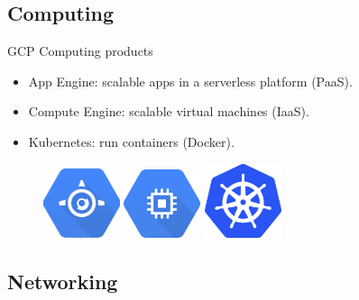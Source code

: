 \documentclass{beamer}
\begin{document}
\subsection{Computing}

\begin{frame}[fragile]{GCP Computing products}
  \begin{itemize}[<+->]
    \item App Engine: scalable apps in a serverless platform (PaaS).
    \item Compute Engine: scalable virtual machines (IaaS).
    \item Kubernetes: run containers (Docker).
  \end{itemize}
  \vspace{1cm}
  \begin{figure}[H]
    \includegraphics[width=0.2\textwidth]{../img/app_engine}
    \hspace{1cm}   \includegraphics[width=0.2\textwidth]{../img/compute_engine}
    \hspace{1cm}
     \includegraphics[width=0.2\textwidth]{../img/kubernetes}
  \end{figure}

\end{frame}

\subsection{Networking}
\end{document}

